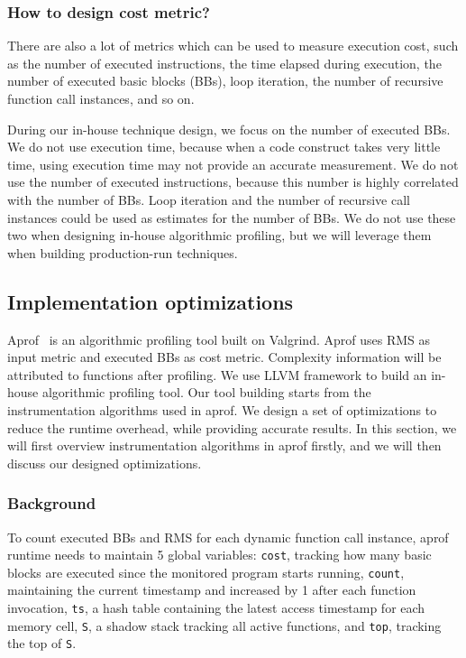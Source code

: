 \subsubsection{How to design cost metric?}
There are also a lot of metrics which can be used to measure execution cost, 
such as the number of executed instructions, 
the time elapsed during execution,
the number of executed basic blocks (BBs), 
loop iteration, 
the number of recursive function call instances, and so on.

During our in-house technique design, 
we focus on the number of executed BBs. 
We do not use execution time, 
because when a code construct takes very little time,
using execution time may not provide an accurate measurement. 
We do not use the number of executed instructions, 
because this number is highly correlated with the number of BBs. 
Loop iteration and the number of recursive call instances could be used as estimates 
for the number of BBs. 
We do not use these two when designing in-house algorithmic profiling, 
but we will leverage them when building production-run techniques.  
 

\subsection{Implementation optimizations}

Aprof~\cite{Aprof1, Aprof2} is an algorithmic profiling tool built on Valgrind. 
Aprof uses RMS as input metric and executed BBs as cost metric.
Complexity information will be attributed to functions after profiling. 
We use LLVM framework to build an in-house algorithmic profiling tool.
Our tool building starts from the instrumentation algorithms used in aprof. 
We design a set of optimizations to reduce the runtime overhead, 
while providing accurate results.
In this section, we will first overview instrumentation algorithms in aprof firstly, 
and we will then discuss our designed optimizations. 

\subsubsection{Background}
To count executed BBs and RMS for each dynamic function call instance,
aprof runtime needs to maintain 5 global variables:
\texttt{cost}, 
tracking how many basic blocks are executed since the monitored program starts running, 
\texttt{count}, 
maintaining the current timestamp and increased by 1 after each function invocation, 
\texttt{ts}, 
a hash table containing the latest access timestamp for each memory cell,
\texttt{S}, 
a shadow stack tracking all active functions, 
and \texttt{top}, 
tracking the top of \texttt{S}.

